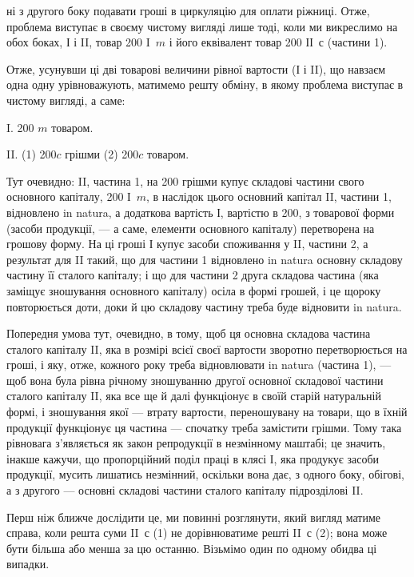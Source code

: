 \parcont{}  %
ні з другого боку подавати гроші в циркуляцію для оплати ріжниці.
Отже, проблема виступає в своєму чистому вигляді лише тоді, коли ми
викреслимо на обох боках, І і II, товар 200 I~$m$ і його еквівалент товар
200 ІІ~$с$ (частини 1).

Отже, усунувши ці дві товарові величини рівної вартости (І і II),
що навзаєм одна одну урівноважують, матимемо решту обміну, в якому
проблема виступає в чистому вигляді, а саме:

I. 200 $m$ товаром.

II. (1) 200$c$ грішми \dplus{} (2) 200$c$ товаром.

Тут очевидно: II, частина 1, на 200 грішми купує складові частини
свого основного капіталу, 200 І~$m$, в наслідок цього основний капітал II,
частини 1, відновлено in natura, а додаткова вартість І, вартістю в 200,
з товарової форми (засоби продукції, — а саме, елементи основного
капіталу) перетворена на грошову форму. На ці гроші І купує засоби
споживання у II, частини 2, а результат для II такий, що для частини 1
відновлено in natura основну складову частину її сталого капіталу; і що
для частини 2 друга складова частина (яка заміщує зношування основного
капіталу) осіла в формі грошей, і це щороку повторюється доти,
доки й цю складову частину треба буде відновити in natura.

Попередня умова тут, очевидно, в тому, щоб ця основна складова частина
сталого капіталу II, яка в розмірі всієї своєї вартости зворотно перетворюється
на гроші, і яку, отже, кожного року треба відновлювати in natura
(частина 1), — щоб вона була рівна річному зношуванню другої основної
складової частини сталого капіталу II, яка все ще й далі функціонує в
своїй старій натуральній формі, і зношування якої — втрату вартости,
переношувану на товари, що в їхній продукції функціонує ця частина —
спочатку треба замістити грішми. Тому така рівновага з’являється як
закон репродукції в незмінному маштабі; це значить, інакше кажучи, що
пропорційний поділ праці в клясі І, яка продукує засоби продукції,
мусить лишатись незмінний, оскільки вона дає, з одного боку, обігові,
а з другого — основні складові частини сталого капіталу підрозділові II.

Перш ніж ближче дослідити це, ми повинні розглянути, який вигляд
матиме справа, коли решта суми II~$с$ (1) не дорівнюватиме решті II~$с$
(2); вона може бути більша або менша за цю останню. Візьмімо один
по одному обидва ці випадки.

